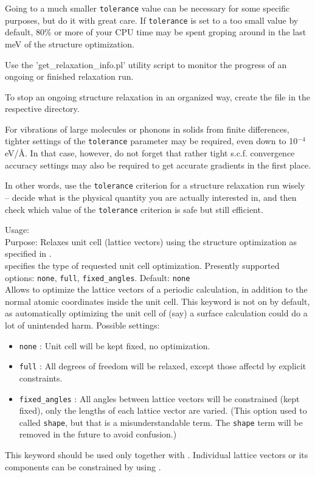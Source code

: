 Going to a much smaller \texttt{tolerance} value can be necessary for
some specific purposes, but do it with great care. If
\texttt{tolerance} is set to a too small value by default, 80\% or
more of your CPU time may be spent groping around in the last meV of
the structure optimization.

Use the 'get\_relaxation\_info.pl' utility script to monitor the
progress of an ongoing or finished relaxation run.

To stop an ongoing structure relaxation in an organized way, create
the  file in the respective directory.

For vibrations of large molecules or phonons in solids from finite
differences, tighter settings of the \texttt{tolerance} parameter may
be required, even down to 10$^{-4}$ eV/{\AA}. In that case, however,
do not forget that rather tight s.c.f. convergence accuracy settings
may also be required to get accurate gradients in the first place. 

In other words, use the \texttt{tolerance} criterion for a structure
relaxation run wisely -- decide what is the physical quantity you are
actually interested in, and then check which value of the
\texttt{tolerance} criterion is safe but still efficient.


{
  \noindent
  Usage:    \\[1.0ex] 
  Purpose: Relaxes unit cell (lattice vectors) using the structure 
           optimization as specified in . \\[1.0ex]
   specifies the type of requested unit cell 
    optimization. Presently supported options: \texttt{none},
    \texttt{full}, \texttt{fixed\_angles}. Default: \texttt{none}\\
}
Allows to optimize the lattice vectors of a periodic calculation, in
addition to the normal atomic coordinates inside the unit cell. This
keyword is not on by default, as automatically optimizing the unit
cell of (say) a surface calculation could do a lot of unintended
harm. Possible settings:
\begin{itemize}
  \item \texttt{none} : Unit cell will be kept fixed, no
    optimization. 
  \item \texttt{full} : All  degrees of
    freedom will be relaxed, except those affectd by explicit
    constraints.
  \item \texttt{fixed\_angles} : All angles between lattice vectors
    will be constrained (kept fixed), only the lengths of each lattice
    vector are varied. (This option used to called \texttt{shape}, but
    that is a misunderstandable term. The \texttt{shape} term will be
    removed in the future to avoid confusion.)
\end{itemize}
This keyword should be used only together with .
Individual lattice vectors or its components can be constrained by using 
.

